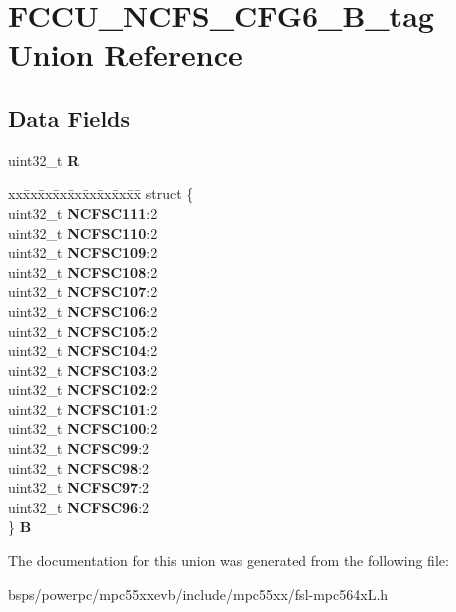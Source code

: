 \hypertarget{unionFCCU__NCFS__CFG6__32B__tag}{}\section{F\+C\+C\+U\+\_\+\+N\+C\+F\+S\+\_\+\+C\+F\+G6\+\_\+B\+\_\+tag Union Reference}
\label{unionFCCU__NCFS__CFG6__32B__tag}
\subsection*{Data Fields}
\begin{DoxyCompactItemize}
\item 
\mbox{\label{unionFCCU__NCFS__CFG6__32B__tag_a67f814fad5e69eae16dec921cfd7c42a}} 
uint32\+\_\+t {\bfseries R}
\item 
\mbox{\label{unionFCCU__NCFS__CFG6__32B__tag_a33ee162c964fc9decb0647dbcb818d14}} 
\begin{tabbing}
xx\=xx\=xx\=xx\=xx\=xx\=xx\=xx\=xx\=\kill
struct \{\\
\>uint32\_t {\bfseries NCFSC111}:2\\
\>uint32\_t {\bfseries NCFSC110}:2\\
\>uint32\_t {\bfseries NCFSC109}:2\\
\>uint32\_t {\bfseries NCFSC108}:2\\
\>uint32\_t {\bfseries NCFSC107}:2\\
\>uint32\_t {\bfseries NCFSC106}:2\\
\>uint32\_t {\bfseries NCFSC105}:2\\
\>uint32\_t {\bfseries NCFSC104}:2\\
\>uint32\_t {\bfseries NCFSC103}:2\\
\>uint32\_t {\bfseries NCFSC102}:2\\
\>uint32\_t {\bfseries NCFSC101}:2\\
\>uint32\_t {\bfseries NCFSC100}:2\\
\>uint32\_t {\bfseries NCFSC99}:2\\
\>uint32\_t {\bfseries NCFSC98}:2\\
\>uint32\_t {\bfseries NCFSC97}:2\\
\>uint32\_t {\bfseries NCFSC96}:2\\
\} {\bfseries B}\\

\end{tabbing}\end{DoxyCompactItemize}


The documentation for this union was generated from the following file\+:\begin{DoxyCompactItemize}
\item 
bsps/powerpc/mpc55xxevb/include/mpc55xx/fsl-\/mpc564x\+L.\+h\end{DoxyCompactItemize}
